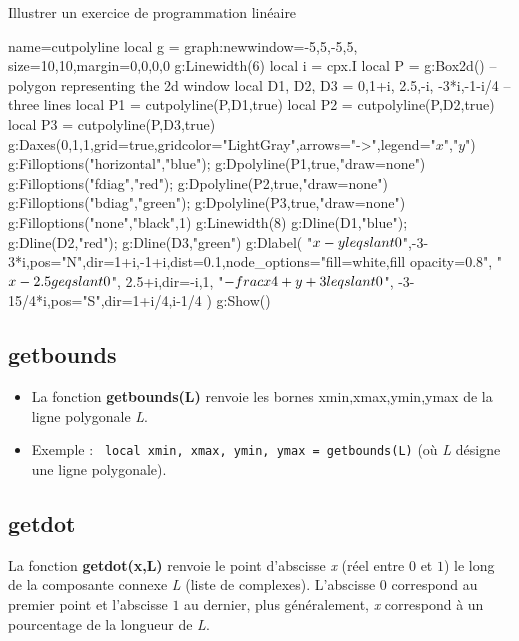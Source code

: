\begin{demo}{Illustrer un exercice de programmation linéaire}
\begin{luadraw}{name=cutpolyline}
local g = graph:new{window={-5,5,-5,5}, size={10,10},margin={0,0,0,0}}
g:Linewidth(6)
local i = cpx.I
local P = g:Box2d() -- polygon representing the 2d window
local D1, D2, D3 = {0,1+i}, {2.5,-i}, {-3*i,-1-i/4}  -- three lines
local P1 = cutpolyline(P,D1,true)
local P2 = cutpolyline(P,D2,true)
local P3 = cutpolyline(P,D3,true)
g:Daxes({0,1,1},{grid=true,gridcolor="LightGray",arrows="->",legend={"$x$","$y$"}})
g:Filloptions("horizontal","blue"); g:Dpolyline(P1,true,"draw=none")
g:Filloptions("fdiag","red"); g:Dpolyline(P2,true,"draw=none")
g:Filloptions("bdiag","green"); g:Dpolyline(P3,true,"draw=none")
g:Filloptions("none","black",1)
g:Linewidth(8)
g:Dline(D1,"blue"); g:Dline(D2,"red"); g:Dline(D3,"green")
g:Dlabel(
    "$x-y\\leqslant 0$",-3-3*i,{pos="N",dir={1+i,-1+i},dist=0.1,node_options="fill=white,fill opacity=0.8"},
    "$x-2.5\\geqslant0$", 2.5+i,{dir={-i,1}},
    "$-\\frac{x}{4}+y+3\\leqslant0$", -3-15/4*i,{pos="S",dir={1+i/4,i-1/4}}
)
g:Show()
\end{luadraw}
\end{demo}

\subsection{getbounds}
\begin{itemize}
    \item La fonction \textbf{getbounds(L)} renvoie les bornes xmin,xmax,ymin,ymax de la ligne polygonale \emph{L}.
    \item Exemple : \texttt{ local xmin, xmax, ymin, ymax = getbounds(L)} (où \emph{L} désigne une ligne polygonale).
\end{itemize}

\subsection{getdot}
La fonction \textbf{getdot(x,L)} renvoie le point d'abscisse \emph{x} (réel entre $0$ et $1$) le long de la composante connexe \emph{L} (liste de complexes). L'abscisse $0$ correspond au premier point et l'abscisse $1$ au dernier, plus généralement, \emph{x} correspond à un pourcentage de la longueur de \emph{L}.

